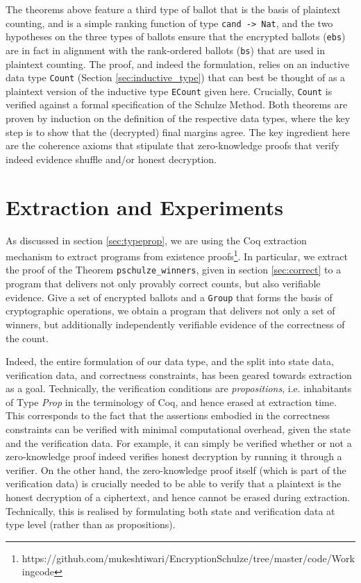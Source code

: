 \noindent
The theorems above feature a third type of ballot that is the basis
of plaintext counting, and is a simple ranking function of type
\texttt{cand -> Nat}, and the two hypotheses on the three types of
ballots ensure that the encrypted ballots (\texttt{ebs}) are in fact
in alignment with the rank-ordered ballots (\texttt{bs}) that are
used in plaintext counting. The proof, and indeed the formulation, 
relies on an inductive data
type \texttt{Count}  (Section \ref{sec:inductive_type}) that can best be 
thought of as a plaintext
version of the inductive type  \texttt{ECount} given here.
Crucially, \texttt{Count} is verified against a formal specification
of the Schulze Method. Both theorems are proven by induction on the
definition of the respective data types, where the key step is to
show that the (decrypted) final margins agree. The key ingredient
here are the coherence axioms that stipulate that zero-knowledge
proofs that verify indeed evidence shuffle and/or honest decryption.


\section{Extraction and Experiments} \label{sec:extract}

As discussed in section \ref{sec:typeprop}, 
we are using  the Coq extraction
mechanism \citep{Letouzey:2003:NEC}  to extract programs from
existence proofs\footnote{https://github.com/mukeshtiwari/EncryptionSchulze/tree/master/code/Workingcode}.
In particular, we extract the proof of the Theorem
\texttt{pschulze\_winners}, given in section \ref{sec:correct} to a
program that delivers not only provably correct counts, but also
verifiable evidence.  Give a set of encrypted ballots and a \texttt{Group}
that forms the basis of cryptographic operations, we obtain a program that
delivers not only a set of winners, but additionally independently  verifiable
evidence of the correctness of the count. 

Indeed, the entire formulation of our data type, and the split into
state data, verification data, and correctness constraints, has been
geared towards extraction as a goal. Technically, the verification
conditions are \emph{propositions}, i.e. inhabitants of Type
\emph{Prop} in the terminology of Coq, and hence erased at
extraction time. This corresponds to the fact that the assertions
embodied in the correctness constraints can be verified with minimal
computational overhead, given the state and the verification data.
For example, it can simply be verified whether or not a zero-knowledge 
proof indeed verifies honest decryption by running
it through a verifier.  On the other hand, the zero-knowledge proof
itself (which is part of the verification data) is crucially needed
to be able to verify that a plaintext is the honest decryption of a
ciphertext, and hence cannot be erased during extraction.
Technically, this is realised by formulating both state and
verification data at type level (rather than as propositions). 

